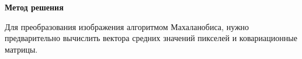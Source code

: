 \textbf{\large Метод решения}

Для преобразования изображения алгоритмом Махаланобиса, нужно предварительно вычислить вектора средних значений пикселей и ковариационные матрицы.

